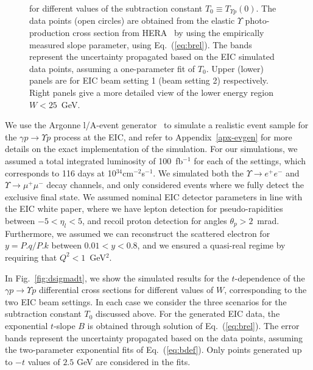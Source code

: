 \documentclass[prd,amsmath,twocolumn,floatfix,amssymb, preprintnumbers, linenumbers,nofootinbib, superscriptaddress]{revtex4}
\begin{document}
\begin{figure}
{for different values of the subtraction constant $T_0 \equiv T_{\Upsilon p} (0)$. The data points (open circles) are obtained from the elastic $\Upsilon$ photo-production cross 
section from HERA~\cite{Adloff:2000vm,Breitweg:1998ki,Chekanov:2009zz}
 by using the empirically measured slope parameter, using Eq.~(\ref{eq:brel}). The bands represent the uncertainty propagated based on the EIC simulated  data points, assuming a one-parameter fit of $T_0$. Upper (lower) panels are for EIC beam setting 1 (beam setting 2) respectively. Right panels give a more detailed view of the lower energy region $W < 25$~GeV.}
\label{fig:dsigmadt0}
\end{figure}

We use the Argonne l/A-event generator~\cite{git:lager} to simulate a realistic event sample for the $\gamma p \to \Upsilon p$ process at the EIC, and refer to Appendix~\ref{apx-evgen} for more details on the exact implementation of the simulation. 
For our simulations, we assumed a total integrated luminosity of 100~fb$^{-1}$ for each of the settings, which corresponds to 116 days at 10$^{34}$cm$^{-2}$s$^{-1}$.
We simulated both the $\Upsilon \to e^+e^-$ and $\Upsilon \to \mu^+\mu^-$ decay channels, and only considered events where we fully detect the exclusive final state.
We assumed nominal EIC detector parameters in line with the EIC  white paper, where we have lepton detection for pseudo-rapidities between $-5 < \eta_l < 5$, and recoil proton detection for angles $\theta_p > 2$~mrad. 
Furthermore, we assumed we can reconstruct the scattered electron for 
$y = P.q/P.k$ between $0.01 < y < 0.8$, and we ensured a 
quasi-real regime by requiring that $Q^2 < 1$~GeV$^{2}$.

In Fig.~\ref{fig:dsigmadt}, we show the simulated results for the $t$-dependence of the $\gamma p \to \Upsilon p$ 
differential cross sections for different values of $W$,  
corresponding to the two EIC beam settings. 
In each case we consider the three scenarios for the subtraction constant $T_0$ discussed above. 
For the generated EIC data, the exponential $t$-slope $B$ is obtained through solution of Eq.~(\ref{eq:brel}). 
The error bands represent the uncertainty propagated based on the data points, assuming the two-parameter exponential fits of Eq.~(\ref{eq:bdef}). 
Only points generated up to $-t$ values of $2.5$ GeV are considered in the fits.
\end{document}
